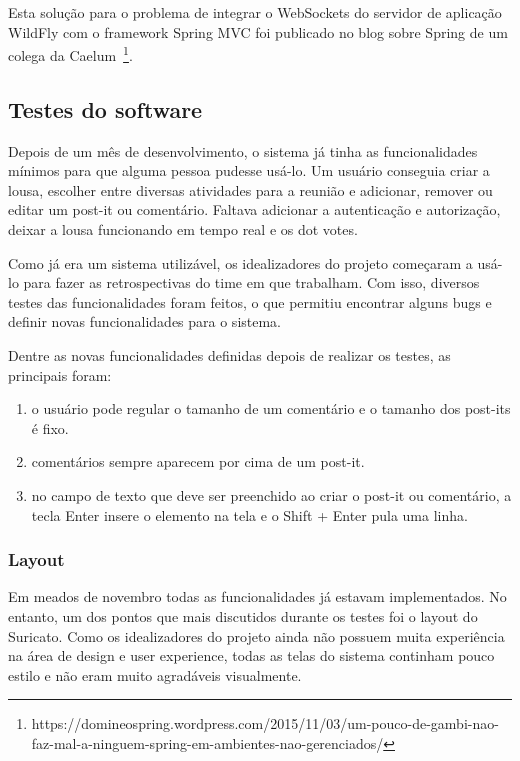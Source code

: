 Esta solução para o problema de integrar o WebSockets do servidor de aplicação WildFly com o framework Spring MVC foi publicado no blog sobre Spring de um colega da Caelum~\footnote{https://domineospring.wordpress.com/2015/11/03/um-pouco-de-gambi-nao-faz-mal-a-ninguem-spring-em-ambientes-nao-gerenciados/}. 

\subsection{Testes do software}

Depois de um mês de desenvolvimento, o sistema já tinha as funcionalidades mínimos para que alguma pessoa pudesse usá-lo. Um usuário conseguia criar a lousa, escolher entre diversas atividades para a reunião e adicionar, remover ou editar um post-it ou comentário. Faltava adicionar a autenticação e autorização, deixar a lousa funcionando em tempo real e os dot votes.

Como já era um sistema utilizável, os idealizadores do projeto começaram a usá-lo para fazer as retrospectivas do time em que trabalham. Com isso, diversos testes das funcionalidades foram feitos, o que permitiu encontrar alguns bugs e definir novas funcionalidades para o sistema.

Dentre as novas funcionalidades definidas depois de realizar os testes, as principais foram:

\begin{enumerate}
	\item o usuário pode regular o tamanho de um comentário e o tamanho dos post-its é fixo.
	\item comentários sempre aparecem por cima de um post-it.
	\item no campo de texto que deve ser preenchido ao criar o post-it ou comentário, a tecla Enter insere o elemento na tela e o Shift + Enter pula uma linha.
\end{enumerate}

\subsubsection*{Layout}

Em meados de novembro todas as funcionalidades já estavam implementados. No entanto, um dos pontos que mais discutidos durante os testes foi o layout do Suricato. Como os idealizadores do projeto ainda não possuem muita experiência na área de design e user experience, todas as telas do sistema continham pouco estilo e não eram muito agradáveis visualmente.

